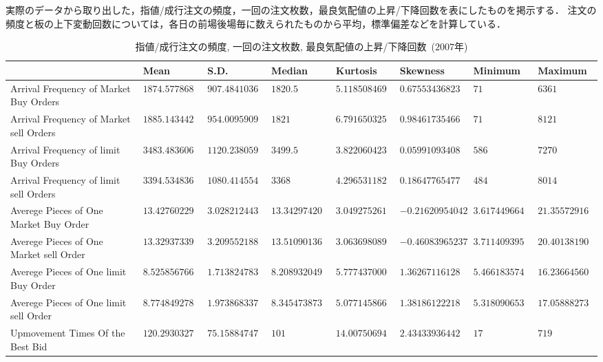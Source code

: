 \documentclass[a4j,papersize,disablejfam,slide,14pt]{jsarticle}
\newcommand{\bhline}[1]{\noalign {\hrule height #1}} %
\begin{document}
    実際のデータから取り出した，指値/成行注文の頻度，一回の注文枚数，最良気配値の上昇/下降回数を表にしたものを掲示する．
    注文の頻度と板の上下変動回数については，各日の前場後場毎に数えられたものから平均，標準偏差などを計算している．
    \begin{table}[H]
    	\centering
        \caption{指値/成行注文の頻度, 一回の注文枚数, 最良気配値の上昇/下降回数\ ($2007$年)}
        \fontsize{6pt}\selectfont
    	\begin{tabularx}{\linewidth}{l||lllllll} \bhline{1.5pt}
        \label{tb:statistics_parameters}
        	 & {\rm Mean} & {\rm S.D.} & {\rm Median} & {\rm Kurtosis} & {\rm Skewness} & {\rm Minimum} & {\rm Maximum} \\ \hline \hline
			{\rm Arrival Frequency of Market Buy Orders} & $1874.57786885246$ & $907.484103685263$ & $1820.5$ & $5.1185084691139$ & $0.675534368239935$ & $71$ & $6361$ \\ \hline
			{\rm Arrival Frequency of Market sell Orders} & $1885.14344262295$ & $954.009590995031$ & $1821$ & $6.79165032585533$ & $0.984617354667294$ & $71$ & $8121$ \\ \hline
			{\rm Arrival Frequency of limit Buy Orders} & $3483.48360655738$ & $1120.23805942858$ & $3499.5$ & $3.82206042384918$ & $0.0599109340880956$ & $586$ & $7270$ \\ \hline
			{\rm Arrival Frequency of limit sell Orders} & $3394.53483606557$ & $1080.4145540672$ & $3368$ & $4.29653118280392$ & $0.18647765477941$ & $484$ & $8014$ \\ \hline
			{\rm Averege Pieces of One Market Buy Order} & $13.4276022948203$ & $3.02821244393427$ & $13.3429742057251$ & $3.04927526108989$ & $-0.216209540427003$ & $3.61744966442953$ & $21.3557291666667$ \\ \hline
			{\rm Averege Pieces of One Market sell Order} & $13.3293733928831$ & $3.20955218830292$ & $13.5109013640969$ & $3.06369808944509$ & $-0.460839652375353$ & $3.71140939597315$ & $20.4013819095477$ \\ \hline
			{\rm Averege Pieces of One limit Buy Order} & $8.52585676649367$ & $1.71382478337069$ & $8.20893204942981$ & $5.77743700031615$ & $1.36267116128345$ & $5.46618357487923$ & $16.2366456059736$ \\ \hline
			{\rm Averege Pieces of One limit sell Order} & $8.77484927828575$ & $1.97386833754685$ & $8.34547387331226$ & $5.07714586629268$ & $1.38186122218224$ & $5.31809065383073$ & $17.0588827377957$ \\ \hline
			{\rm Upmovement Times Of the Best Bid} & $120.293032786885$ & $75.1588474753461$ & $101$ & $14.0075069407575$ & $2.43433936442679$ & $17$ & $719$ \\ \hline

\end{tabularx}
\end{table}
\end{document}
